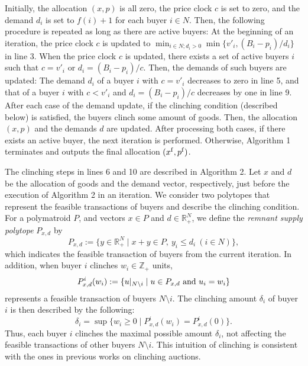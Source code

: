 \documentclass[letterpaper,11pt]{article}
\begin{document}
Initially, the allocation $(x,p)$ is all zero, the price clock $c$ is set to zero, and the demand $d_i$ is set to $f(i)+1$ for each buyer $i\in N$. Then, the following procedure is repeated as long as there are active buyers: At the beginning of an iteration, the price clock $c$ is updated to $\min_{i\in N; d_i>0}\min\{v'_i, (B_i-p_i)/d_i\}$ in line 3. When the price clock $c$ is updated, there exists a set of active buyers $i$ such that $c=v'_i$ or $d_i=(B_i-p_i)/c$. Then, the demands of such buyers are updated: The demand $d_i$ of a buyer $i$ with $c=v'_i$ decreases to zero in line 5, and that of a buyer $i$ with $c<v'_i$ and $d_i=(B_i-p_i)/c$ decreases by one in line 9. After each case of the demand update, if the clinching condition (described below) is satisfied, the buyers clinch some amount of goods. Then, the allocation $(x,p)$ and the demands $d$ are updated. After processing both cases, if there exists an active buyer, the next iteration is performed. Otherwise, Algorithm 1 terminates and outputs the final allocation $(x^{\rm f},p^{\rm f})$.

The clinching steps in lines 6 and 10 are described in Algorithm 2.
Let $x$ and $d$ be the allocation of goods and the demand vector, 
respectively, just before the execution of Algorithm 2 in an iteration.
We consider two polytopes that represent the feasible transactions 
of buyers and describe the clinching condition.
For a polymatroid $P$, and vectors $x\in P$ and $d\in \mathbb R^N_{+}$, 
we define the {\it remnant supply polytope} $P_{x,d}$ by
\begin{equation*}
\label{remnant_supply_polytope}
P_{x,d}:=\{y\in \mathbb R^N_{+}\mid x+y\in P,\ y_i\leq d_i \ (i\in N)\}, 
\end{equation*} 
which indicates the feasible transaction of buyers from the current iteration.
In addition, when buyer $i$ clinches $w_i\in \mathbb Z_+$ units, 
\begin{equation}
\label{feasible_transaction}
P^i_{x,d}(w_i):=\{u\vert_{N\setminus i}\mid  u\in P_{x,d}\ {\rm and}\ u_i=w_i\}
\end{equation}
represents a feasible transaction of buyers $N\setminus i$.
The clinching amount $\delta_i$ of buyer $i$ is then described by the following:
\begin{equation}
\label{clinching_definition}
\delta_i=\sup\{w_i\geq 0\mid P^i_{x,d}(w_i)=P^i_{x,d}(0)\}.
\end{equation}
Thus, each buyer $i$ clinches the maximal possible amount $\delta_i$, 
not affecting the feasible transactions of other buyers $N\setminus i$. 
This intuition of clinching is consistent with the ones in previous works
\cite{A2004, BCMX2010, BHLS2015,DHS2015, DLN2012, FLSS2011,GMP2014,GMP2015, GMP2020} 
on clinching auctions.
\end{document}
